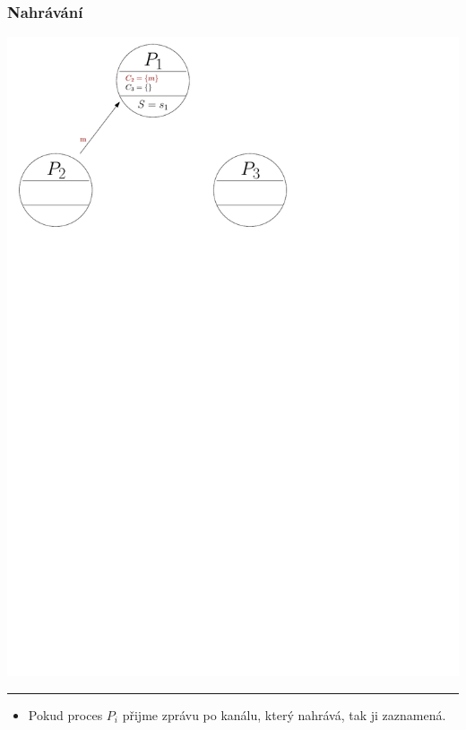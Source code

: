 \documentclass[usenames,dvipsnames,9pt]{beamer}
\begin{document}
\begin{frame}
\frametitle{Nahrávání}
	\vspace{1.8em}
	\begin{center}
		{\includegraphics[width=\snapsize\linewidth]{13/figs/snapshot2.pdf}}%
	\end{center}

	{
		\vspace{2em}\hrule\vspace{1em}
		\begin{itemize}
			\item Pokud proces $P_i$ přijme zprávu po kanálu, který nahrává, tak ji zaznamená.
		\end{itemize}
	}
\vspace{4em}
\end{frame}
\end{document}
